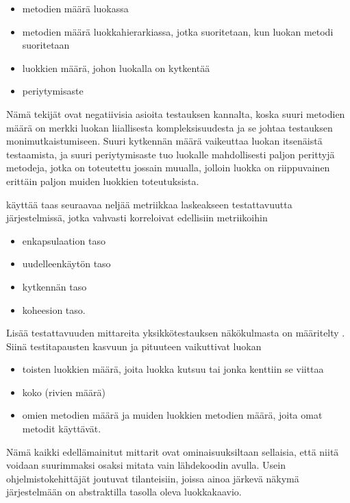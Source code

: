 \documentclass[finnish]{tktltiki2}
\theoremstyle{definition}
\theoremstyle{remark}
\begin{document}
\begin{itemize}
	\item metodien määrä luokassa
	\item metodien määrä luokkahierarkiassa, jotka suoritetaan, kun luokan metodi suoritetaan
	\item luokkien määrä, johon luokalla on kytkentää
	\item periytymisaste
\end{itemize}

\noindent
Nämä tekijät ovat negatiivisia asioita testauksen kannalta, koska suuri metodien määrä on merkki luokan liiallisesta kompleksisuudesta ja se johtaa testauksen monimutkaistumiseen. Suuri kytkennän määrä vaikeuttaa luokan itsenäistä testaamista, ja suuri periytymisaste tuo luokalle mahdollisesti paljon perittyjä metodeja, jotka on toteutettu jossain muualla, jolloin luokka on riippuvainen erittäin paljon muiden luokkien toteutuksista. 

\citep[s. 3-4]{Khan:2009:MBT:1507195.1507204} käyttää taas seuraavaa neljää metriikkaa laskeakseen testattavuutta järjestelmissä, jotka vahvasti korreloivat edellisiin metriikoihin 

\begin{itemize}
	\item enkapsulaation taso
	\item uudelleenkäytön taso
	\item kytkennän taso
	\item koheesion taso.
\end{itemize}   


Lisää testattavuuden mittareita yksikkötestauksen näkökulmasta on määritelty \citep[s. 9]{Bruntink:2004}. Siinä testitapausten kasvuun ja pituuteen vaikuttivat luokan 

\begin{itemize}
	\item toisten luokkien määrä, joita luokka kutsuu tai jonka kenttiin se viittaa
	\item koko (rivien määrä)
	\item omien metodien määrä ja muiden luokkien metodien määrä, joita omat metodit käyttävät.
\end{itemize} 

Nämä kaikki edellämainitut mittarit ovat ominaisuuksiltaan sellaisia, että niitä voidaan suurimmaksi osaksi mitata vain lähdekoodin avulla. Usein ohjelmistokehittäjät joutuvat tilanteisiin, joissa ainoa järkevä näkymä järjestelmään on abstraktilla tasolla oleva luokkakaavio.
\end{document}
